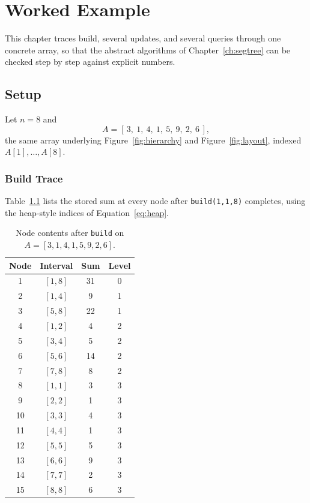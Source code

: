 \documentclass[
  11pt,
  a4paper,
  twoside=false,
  numbers=noenddot,
  headings=big,
  parskip=half,
  toc=bibliography,
  toc=listof,
  bibliography=totoc
]{scrreprt}
\newcounter{example}[chapter]
\newcommand{\tblhead}[1]{\textbf{\sffamily #1}}
\begin{document}
\chapter{Worked Example}
\label{ch:worked-example}

This chapter traces build, several updates, and several queries through one concrete array, so that the abstract algorithms of Chapter~\ref{ch:segtree} can be checked step by step against explicit numbers.

\section{Setup}
\label{sec:query-example}
Let $n=8$ and
\[
A = [\,3,\ 1,\ 4,\ 1,\ 5,\ 9,\ 2,\ 6\,],
\]
the same array underlying Figure~\ref{fig:hierarchy} and Figure~\ref{fig:layout}, indexed $A[1],\dots,A[8]$.

\subsection{Build Trace}
Table~\ref{tab:build-trace} lists the stored sum at every node after \texttt{build(1,1,8)} completes, using the heap-style indices of Equation~\eqref{eq:heap}.

\begin{table}[h]
\centering
\caption{Node contents after \texttt{build} on $A=[3,1,4,1,5,9,2,6]$.}
\label{tab:build-trace}
\begin{tabular}{cccc}
\toprule
\tblhead{Node} & \tblhead{Interval} & \tblhead{Sum} & \tblhead{Level} \\
\midrule
1  & $[1,8]$ & 31 & 0 \\
2  & $[1,4]$ & 9  & 1 \\
3  & $[5,8]$ & 22 & 1 \\
4  & $[1,2]$ & 4  & 2 \\
5  & $[3,4]$ & 5  & 2 \\
6  & $[5,6]$ & 14 & 2 \\
7  & $[7,8]$ & 8  & 2 \\
8  & $[1,1]$ & 3  & 3 \\
9  & $[2,2]$ & 1  & 3 \\
10 & $[3,3]$ & 4  & 3 \\
11 & $[4,4]$ & 1  & 3 \\
12 & $[5,5]$ & 5  & 3 \\
13 & $[6,6]$ & 9  & 3 \\
14 & $[7,7]$ & 2  & 3 \\
15 & $[8,8]$ & 6  & 3 \\
\bottomrule
\end{tabular}
\end{table}
\end{document}
